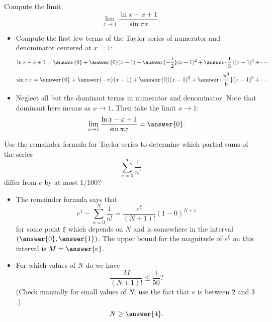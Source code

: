 \documentclass{ximera}
\begin{document}
\begin{exercise}
Compute the limit
\[ \lim_{x \rightarrow 1}  \frac{\ln x - x + 1}{\sin \pi x}. \]
\begin{itemize}
\item Compute the first few terms of the Taylor series of numerator and denominator centered at $x = 1$:
\[ \ln x - x + 1 = \answer{0} + \answer{0} (x-1) + \answer{-\frac{1}{2}} (x-1)^2 + \answer{\frac{1}{3}} (x-1)^3 + \cdots \]
\[ \sin \pi x = \answer{0} + \answer{-\pi}(x-1) + \answer{0} (x-1)^2 + \answer{\frac{\pi^3}{6}}(x-1)^3 + \cdots \]
\item Neglect all but the dominant terms in numerator and denominator. Note that dominant here means as $x \rightarrow 1$. Then take the limit $x \rightarrow 1$:
\[ \lim_{x \rightarrow 1}  \frac{\ln x - x + 1}{\sin \pi x} = \answer{0}. \]
\end{itemize}
\end{exercise}


\begin{exercise}
Use the remainder formula for Taylor series to determine which partial sums of the series 
\[ \sum_{n=0}^\infty \frac{1}{n!} \]
differ from $e$ by at most $1/100$?
\begin{itemize}
\item The remainder formula says that
\[ e^1 - \sum_{n=0}^{N} \frac{1}{n!} = \frac{e^{\xi}}{(N+1)!} (1-0)^{N+1} \]
for some point $\xi$ which depends on $N$ and is somewhere in the interval $(\answer{0},\answer{1})$. The upper bound for the magnitude of $e^\xi$ on this interval is $M = \answer{e}$.
\item For which values of $N$ do we have
\[  \frac{M}{(N+1)!} \leq \frac{1}{50}? \]
(Check manually for small values of $N$; use the fact that $e$ is between $2$ and $3$.)
\[ N \geq \answer{4}. \]
\end{itemize}
\end{exercise}
\end{document}
